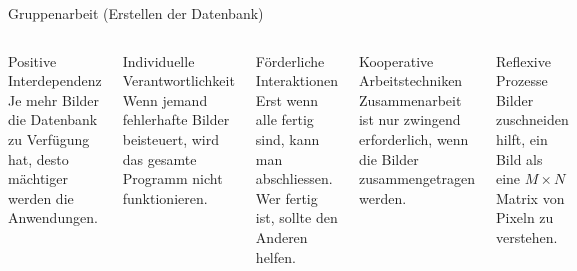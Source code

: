 \documentclass[10pt,aspectratio=169]{beamer}
\begin{document}
\begin{frame}[fragile]{Gruppenarbeit (Erstellen der Datenbank)}
	\begin{columns}[T,onlytextwidth]
		\column{\textwidth}
		\begin{block}{Positive Interdependenz}
			Je mehr Bilder die Datenbank zu Verfügung hat, desto mächtiger werden die Anwendungen.
		\end{block}
		\begin{block}{Individuelle Verantwortlichkeit}
			Wenn jemand fehlerhafte Bilder beisteuert, wird das gesamte Programm nicht funktionieren.
		\end{block}
		\begin{block}{Förderliche Interaktionen}
			Erst wenn alle fertig sind, kann man abschliessen.
			Wer fertig ist, sollte den Anderen helfen.
		\end{block}
		\begin{block}{Kooperative Arbeitstechniken}
			Zusammenarbeit ist nur zwingend erforderlich, wenn die Bilder zusammengetragen werden.
		\end{block}
		\begin{block}{Reflexive Prozesse}
			Bilder zuschneiden hilft, ein Bild als eine $M\times N$ \glqq{}Matrix\grqq{} von Pixeln zu verstehen.
		\end{block}
	\end{columns}
\end{frame}

\end{document}
